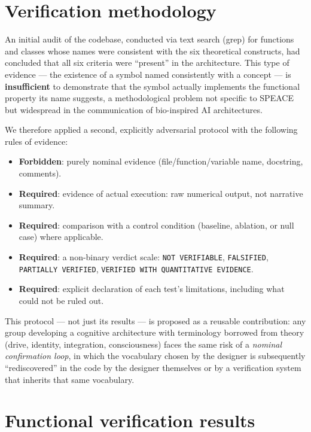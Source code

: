 \documentclass[11pt,a4paper]{article}
\newcommand{\code}[1]{\texttt{#1}}
\begin{document}
\section{Verification methodology}
\label{sec:method}

An initial audit of the codebase, conducted via text search (grep) for functions and classes whose names were consistent with the six theoretical constructs, had concluded that all six criteria were ``present'' in the architecture. This type of evidence --- the existence of a symbol named consistently with a concept --- is \textbf{insufficient} to demonstrate that the symbol actually implements the functional property its name suggests, a methodological problem not specific to SPEACE but widespread in the communication of bio-inspired AI architectures.

We therefore applied a second, explicitly adversarial protocol with the following rules of evidence:

\begin{itemize}
  \item \textbf{Forbidden}: purely nominal evidence (file/function/variable name, docstring, comments).
  \item \textbf{Required}: evidence of actual execution: raw numerical output, not narrative summary.
  \item \textbf{Required}: comparison with a control condition (baseline, ablation, or null case) where applicable.
  \item \textbf{Required}: a non-binary verdict scale: \code{NOT VERIFIABLE}, \code{FALSIFIED}, \code{PARTIALLY VERIFIED}, \code{VERIFIED WITH QUANTITATIVE EVIDENCE}.
  \item \textbf{Required}: explicit declaration of each test's limitations, including what could not be ruled out.
\end{itemize}

This protocol --- not just its results --- is proposed as a reusable contribution: any group developing a cognitive architecture with terminology borrowed from theory (drive, identity, integration, consciousness) faces the same risk of a \emph{nominal confirmation loop}, in which the vocabulary chosen by the designer is subsequently ``rediscovered'' in the code by the designer themselves or by a verification system that inherits that same vocabulary.

\section{Functional verification results}
\label{sec:results}
\end{document}
